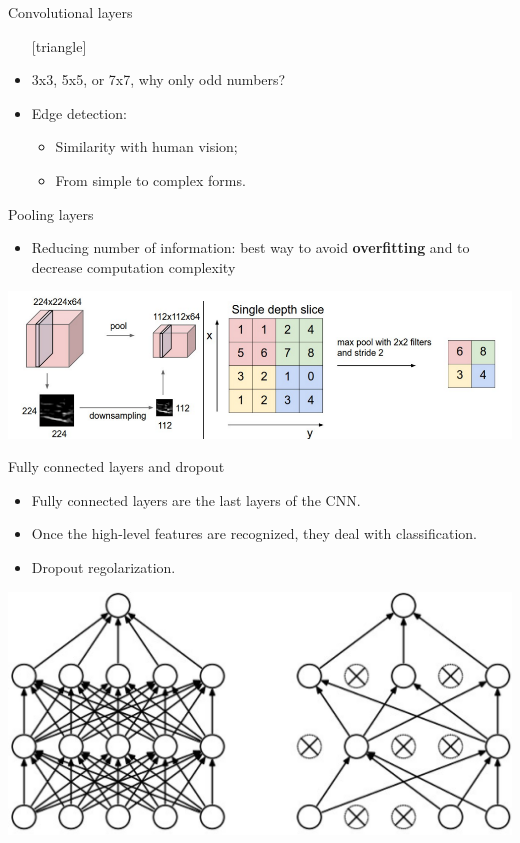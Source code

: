 \documentclass{beamer}
\begin{document}
\begin{frame}{Convolutional layers}
	\begin{itemize}
		\setlength\itemsep{1em}
		[triangle]
		\item 
			3x3, 5x5, or 7x7, why only odd numbers?
		\item 
			Edge detection:
			\begin{itemize}
				[circle]
				\item 
					Similarity with human vision;
				\item 
					From simple to complex forms.
			\end{itemize}
	\end{itemize}
\end{frame}

\begin{frame}{Pooling layers}
	\begin{itemize}
		\setlength\itemsep{1em}
		[triangle]
		\item 
			Reducing number of information: best way to avoid \textbf{overfitting} and to decrease 							computation complexity
	\end{itemize}
	\includegraphics[scale=0.35]{pooling}
\end{frame}

\begin{frame}{Fully connected layers and dropout}
	\begin{itemize}
		\setlength\itemsep{1em}
		[triangle]
		\item 
			Fully connected layers are the last layers of the CNN.
		\item 
			Once the high-level features are recognized, they deal with classification.
		\item
			Dropout regolarization.
	\end{itemize}
	\begin{center}
		\includegraphics[scale=0.35]{dropout}
	\end{center}
\end{frame}
\end{document}

